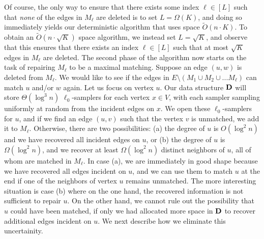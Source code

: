 \documentclass[11pt,a4paper]{article}
\newcommand{\D}{\mathsf{\bf D}}
\begin{document}
Of course, the only way to ensure that there exists some index $\ell \in [L]$ such that {\em none} of the edges in $M_{\ell}$ are deleted is to set $L = \Omega(K)$, and doing so immediately yields our deterministic algorithm that uses space $\tilde{O}(n \cdot K)$.  To obtain an $\tilde{O}(n \cdot \sqrt{K})$ space algorithm, we instead set $L = \sqrt{K}$, and observe that this ensures that there exists an index $\ell \in [L]$ such that at most $\sqrt{K}$ edges in $M_{\ell}$ are deleted. The second phase of the algorithm now starts on the task of repairing $M_{\ell}$ to be a maximal matching. Suppose an edge $(u,w)$ is deleted from $M_{\ell}$. We would like to see if the edges in $E \setminus (M_1 \cup M_2 \cup ... M_{\ell})$ can match $u$ and/or $w$ again. Let us focus on vertex $u$. Our data structure $\D$ will store $\Theta(\log^3 n)$ $\ell_0$-samplers for each vertex $x \in V$, with each sampler sampling uniformly at random from the incident edges on $x$. We open these $\ell_0$-samplers for $u$, and if we find an edge $(u,v)$ such that the vertex $v$ is unmatched, we add it to $M_{\ell}$. Otherwise, there are two possibilities: (a) the degree of $u$ is $O(\log^2 n)$ and we have recovered all incident edges on $u$, or (b) the degree of $u$ is $\Omega(\log^2 n)$, and we recover at least $\Omega(\log^2 n)$ distinct neighbors of $u$, all of whom are matched in $M_{\ell }$. In case (a), we are immediately in good shape because we have recovered all edges incident on $u$, and we can use them to match $u$ at the end if one of the neighbors of vertex $u$ remains unmatched. The more interesting situation is case (b) where on the one hand, the recovered information is not sufficient to repair $u$. On the other hand, we cannot rule out the possibility that $u$ could have been matched, if only we had allocated more space in $\D$ to recover additional edges incident on $u$. We next describe how we eliminate this uncertainity.
\end{document}

